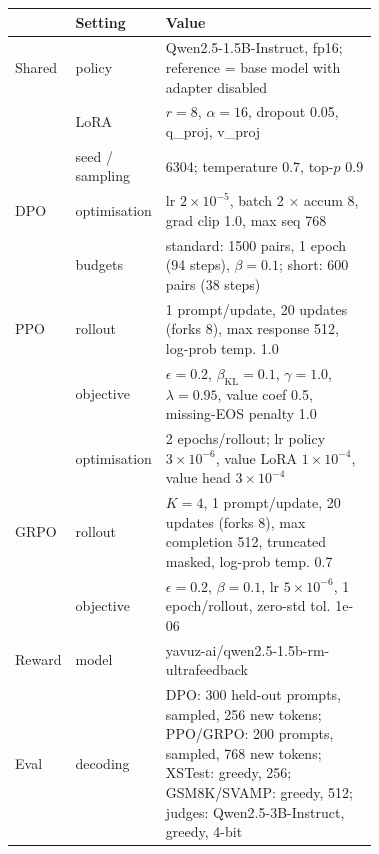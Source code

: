 \begin{tabular}{llp{0.72\linewidth}}
\toprule
 & Setting & Value \\
\midrule
Shared & policy & Qwen2.5-1.5B-Instruct, fp16; reference = base model with adapter disabled \\
 & LoRA & $r{=}8$, $\alpha{=}16$, dropout 0.05, q\_proj, v\_proj \\
 & seed / sampling & 6304; temperature 0.7, top-$p$ 0.9 \\
DPO & optimisation & lr $2{\times}10^{-5}$, batch 2 $\times$ accum 8, grad clip 1.0, max seq 768 \\
 & budgets & standard: 1500 pairs, 1 epoch (94 steps), $\beta{=}0.1$; short: 600 pairs (38 steps) \\
PPO & rollout & 1 prompt/update, 20 updates (forks 8), max response 512, log-prob temp. 1.0 \\
 & objective & $\epsilon{=}0.2$, $\beta_\text{KL}{=}0.1$, $\gamma{=}1.0$, $\lambda{=}0.95$, value coef 0.5, missing-EOS penalty 1.0 \\
 & optimisation & 2 epochs/rollout; lr policy $3{\times}10^{-6}$, value LoRA $1{\times}10^{-4}$, value head $3{\times}10^{-4}$ \\
GRPO & rollout & $K{=}4$, 1 prompt/update, 20 updates (forks 8), max completion 512, truncated masked, log-prob temp. 0.7 \\
 & objective & $\epsilon{=}0.2$, $\beta{=}0.1$, lr $5{\times}10^{-6}$, 1 epoch/rollout, zero-std tol. 1e-06 \\
Reward & model & yavuz-ai/qwen2.5-1.5b-rm-ultrafeedback \\
Eval & decoding & DPO: 300 held-out prompts, sampled, 256 new tokens; PPO/GRPO: 200 prompts, sampled, 768 new tokens; XSTest: greedy, 256; GSM8K/SVAMP: greedy, 512; judges: Qwen2.5-3B-Instruct, greedy, 4-bit \\
\bottomrule
\end{tabular}
